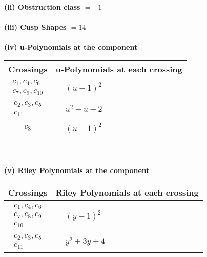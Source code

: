 \documentclass[1p]{elsarticle_modified}
\theoremstyle{definition}
\begin{document}
\flushleft \textbf{(ii) Obstruction class $= -1$}\\~\\
\flushleft \textbf{(iii) Cusp Shapes $= 14$}\\~\\
\newpage\renewcommand{\arraystretch}{1}
\flushleft \textbf{(iv) u-Polynomials at the component}\newline \\
\begin{tabular}{m{50pt}|m{274pt}}
Crossings & \hspace{64pt}u-Polynomials at each crossing \\
\hline $$\begin{aligned}c_{1},c_{4},c_{6}\\c_{7},c_{9},c_{10}\end{aligned}$$&$\begin{aligned}
&(u+1)^2
\end{aligned}$\\
\hline $$\begin{aligned}c_{2},c_{3},c_{5}\\c_{11}\end{aligned}$$&$\begin{aligned}
&u^2- u+2
\end{aligned}$\\
\hline $$\begin{aligned}c_{8}\end{aligned}$$&$\begin{aligned}
&(u-1)^2
\end{aligned}$\\
\hline
\end{tabular}\\~\\
\newpage\renewcommand{\arraystretch}{1}
\flushleft \textbf{(v) Riley Polynomials at the component}\newline \\
\begin{tabular}{m{50pt}|m{274pt}}
Crossings & \hspace{64pt}Riley Polynomials at each crossing \\
\hline $$\begin{aligned}c_{1},c_{4},c_{6}\\c_{7},c_{8},c_{9}\\c_{10}\end{aligned}$$&$\begin{aligned}
&(y-1)^2
\end{aligned}$\\
\hline $$\begin{aligned}c_{2},c_{3},c_{5}\\c_{11}\end{aligned}$$&$\begin{aligned}
&y^2+3 y+4
\end{aligned}$\\
\hline
\end{tabular}\\~\\
\end{document}
